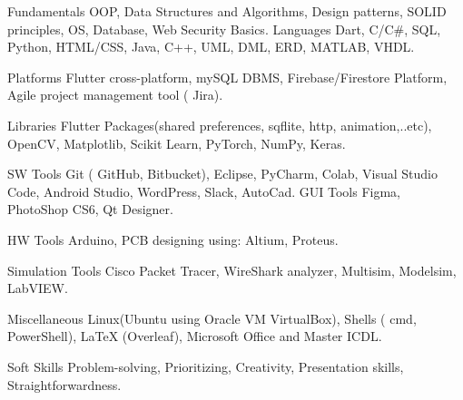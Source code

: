 

\begin{cvskills}

  \cvskill
    {Fundamentals} %
    {OOP, Data Structures and Algorithms, Design patterns, SOLID principles, OS, Database, Web Security Basics.} %
\cvskill
{Languages} %
{ Dart, C/C\#, SQL, Python, HTML/CSS, Java, C++, UML, DML, ERD, MATLAB, VHDL.} %

\cvskill
{Platforms} %
{ Flutter cross-platform, mySQL DBMS, Firebase/Firestore Platform, Agile project management tool ( Jira). } %

\cvskill
{Libraries} %
{Flutter Packages(shared preferences, sqflite, http, animation,..etc), OpenCV, Matplotlib, Scikit Learn, PyTorch, NumPy, Keras.} %

\cvskill
{SW Tools} %
{Git ( GitHub, Bitbucket), Eclipse, PyCharm, Colab, Visual Studio Code, Android Studio, WordPress, Slack, AutoCad.} %
\cvskill
{GUI Tools} %
{Figma, PhotoShop CS6, Qt Designer.} %

\cvskill
{HW Tools} %
{Arduino, PCB designing using: Altium, Proteus.} %

\cvskill
{Simulation Tools} %
{Cisco Packet Tracer, WireShark analyzer, Multisim, Modelsim, LabVIEW.} %

  \cvskill
    {Miscellaneous} %
    {Linux(Ubuntu using Oracle VM VirtualBox), Shells ( cmd, PowerShell), LaTeX (Overleaf), Microsoft Office and Master ICDL.} %

  \cvskill
    {Soft Skills} %
    {Problem-solving, Prioritizing, Creativity, Presentation skills, Straightforwardness.} %

\end{cvskills}

